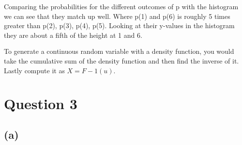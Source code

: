 \documentclass{article}
\begin{document}
Comparing the probabilities for the different outcomes of p with the histogram we can see that they match up well. Where p(1) and p(6) is roughly 5 times greater than p(2), p(3), p(4), p(5). 
Looking at their y-values in the histogram they are about a fifth of the height at 1 and 6.

To generate a continuous random variable with a density function, you would take the cumulative sum of the density function and then find the inverse of it. Lastly compute it as \(X = F - 1(u)\).

\newpage
\section{Question 3}

\subsection{(a)}
\end{document}
